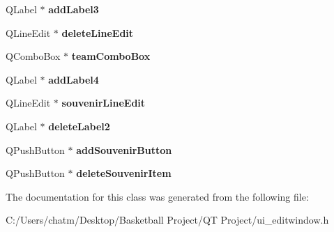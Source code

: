 \begin{DoxyCompactItemize}
\item 
\mbox{\label{class_ui___edit_window_a51f0f2f4524fc6fa8ba30104abd68536}} 
Q\+Label $\ast$ {\bfseries add\+Label3}
\item 
\mbox{\label{class_ui___edit_window_a896becd8435c7e7f23437d3a88c9f37a}} 
Q\+Line\+Edit $\ast$ {\bfseries delete\+Line\+Edit}
\item 
\mbox{\label{class_ui___edit_window_a0230520a2cc3609d6d4fd3a12e5e7a5e}} 
Q\+Combo\+Box $\ast$ {\bfseries team\+Combo\+Box}
\item 
\mbox{\label{class_ui___edit_window_aeac115d010ec9cd47fc5799112d1bd95}} 
Q\+Label $\ast$ {\bfseries add\+Label4}
\item 
\mbox{\label{class_ui___edit_window_afc90d3675a056484023d8b93299881df}} 
Q\+Line\+Edit $\ast$ {\bfseries souvenir\+Line\+Edit}
\item 
\mbox{\label{class_ui___edit_window_a0b303529db668de46cf0bbb23e59bb46}} 
Q\+Label $\ast$ {\bfseries delete\+Label2}
\item 
\mbox{\label{class_ui___edit_window_ac81d61b14402f700845b99a2c22ffe42}} 
Q\+Push\+Button $\ast$ {\bfseries add\+Souvenir\+Button}
\item 
\mbox{\label{class_ui___edit_window_a86f293ea35c706ae45189a50b2940949}} 
Q\+Push\+Button $\ast$ {\bfseries delete\+Souvenir\+Item}
\end{DoxyCompactItemize}


The documentation for this class was generated from the following file\+:\begin{DoxyCompactItemize}
\item 
C\+:/\+Users/chatm/\+Desktop/\+Basketball Project/\+Q\+T Project/ui\+\_\+editwindow.\+h\end{DoxyCompactItemize}
